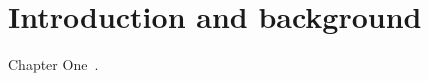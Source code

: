 \chapter{Introduction and background}
\label{ch:introduction-and-background}

Chapter One~\cite{boakes2019exploring}.
